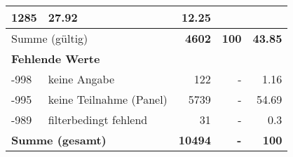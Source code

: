 \begin{longtable}{lXrrr}
       \num{1285} &
       \num[round-mode=places,round-precision=2]{27,92} &
         \num[round-mode=places,round-precision=2]{12,25} \\
     \midrule
     \multicolumn{2}{l}{Summe (gültig)} &
       \textbf{\num{4602}} &
     \textbf{100} &
       \textbf{\num[round-mode=places,round-precision=2]{43,85}} \\
     \multicolumn{5}{l}{\textbf{Fehlende Werte}}\\
       -998 &
       keine Angabe &
         \num{122} &
        - &
         \num[round-mode=places,round-precision=2]{1,16} \\
       -995 &
       keine Teilnahme (Panel) &
         \num{5739} &
        - &
         \num[round-mode=places,round-precision=2]{54,69} \\
       -989 &
       filterbedingt fehlend &
         \num{31} &
        - &
         \num[round-mode=places,round-precision=2]{0,3} \\
     \midrule
     \multicolumn{2}{l}{\textbf{Summe (gesamt)}} &
          \textbf{\num{10494}} &
        \textbf{-} &
        \textbf{100} \\
     \bottomrule
     \end{longtable}
     
